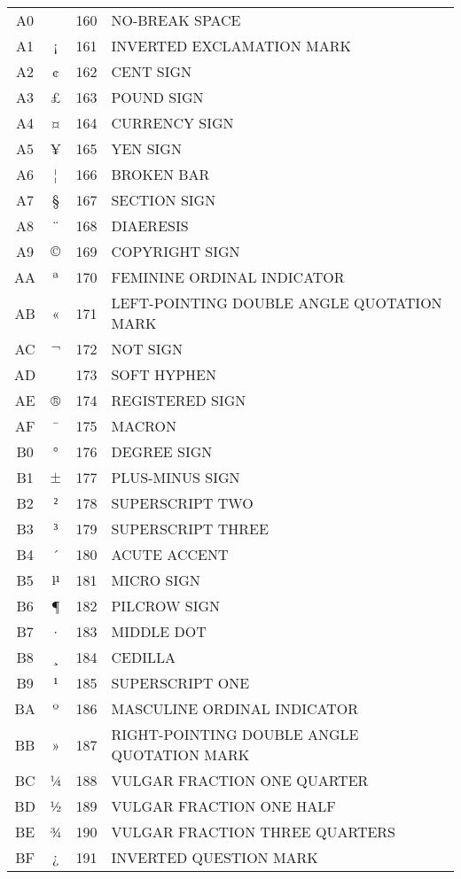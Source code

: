 \documentclass[10pt]{article}
\begin{document}
\pagebreak
\begin{tabular}{ccrl}
A0& &160&NO-BREAK SPACE\\
A1&¡&161&INVERTED EXCLAMATION MARK\\
A2&¢&162&CENT SIGN\\
A3&£&163&POUND SIGN\\
A4&¤&164&CURRENCY SIGN\\
A5&¥&165&YEN SIGN\\
A6&¦&166&BROKEN BAR\\
A7&§&167&SECTION SIGN\\
A8&¨&168&DIAERESIS\\
A9&$©$&169&COPYRIGHT SIGN\\
AA&ª&170&FEMININE ORDINAL INDICATOR\\
AB&«&171&LEFT-POINTING DOUBLE ANGLE QUOTATION MARK\\
AC&$¬$&172&NOT SIGN\\
AD&­&173&SOFT HYPHEN\\
AE&®&174&REGISTERED SIGN\\
AF&¯&175&MACRON\\
B0&°&176&DEGREE SIGN\\
B1&$±$&177&PLUS-MINUS SIGN\\
B2&$²$&178&SUPERSCRIPT TWO\\
B3&$³$&179&SUPERSCRIPT THREE\\
B4&´&180&ACUTE ACCENT\\
B5&$µ$&181&MICRO SIGN\\
B6&¶&182&PILCROW SIGN\\
B7&·&183&MIDDLE DOT\\
B8&¸&184&CEDILLA\\
B9&$¹$&185&SUPERSCRIPT ONE\\
BA&º&186&MASCULINE ORDINAL INDICATOR\\
BB&»&187&RIGHT-POINTING DOUBLE ANGLE QUOTATION MARK\\
BC&¼&188&VULGAR FRACTION ONE QUARTER\\
BD&½&189&VULGAR FRACTION ONE HALF\\
BE&¾&190&VULGAR FRACTION THREE QUARTERS\\
BF&¿&191&INVERTED QUESTION MARK\\
\end{tabular}
\end{document}

